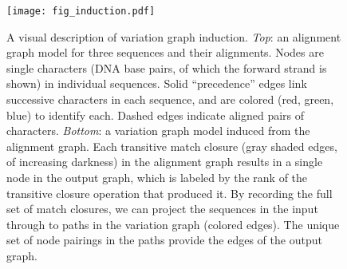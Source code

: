 \vspace{-1em}
\begin{figure}[t!]
   \texttt{[image: fig\_induction.pdf]}
   \caption{
   A visual description of variation graph induction.
   \textit{Top}: an alignment graph model for three sequences and their alignments.
   Nodes are single characters (DNA base pairs, of which the forward strand is shown) in individual sequences.
   Solid ``precedence'' edges link successive characters in each sequence, and are colored (red, green, blue) to identify each.
   Dashed edges indicate aligned pairs of characters.
    \textit{Bottom}: a variation graph model induced from the alignment graph.
   Each transitive match closure (gray shaded edges, of increasing darkness) in the alignment graph results in a single node in the output graph, which is labeled by the rank of the transitive closure operation that produced it.
   By recording the full set of match closures, we can project the sequences in the input through to paths in the variation graph (colored edges).
   The unique set of node pairings in the paths provide the edges of the output graph.
    }
    \label{fig:induction}
\end{figure}
\vspace{-1em}
